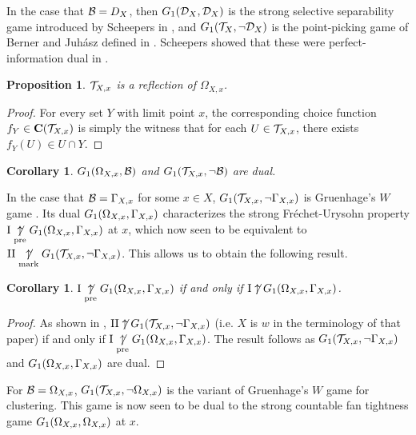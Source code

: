 \documentclass{amsart}
\theoremstyle{plain}
\newtheorem{corollary}[theorem]{Corollary}
\newtheorem{proposition}[theorem]{Proposition}
\theoremstyle{definition}
\theoremstyle{remark}
\theoremstyle{plain}
\theoremstyle{definition}
\theoremstyle{remark}
\begin{document}
In the case that \(\mathcal{B}=D_X\), then \(G_{1}(\mathcal{D}_X,\mathcal{D}_X)\) is the strong selective
separability game introduced by Scheepers 
in \cite{MR1711901}, and \(G_{1}(\mathcal{T}_X,\neg\mathcal{D}_X)\) is the
point-picking game of Berner and Juh\'asz defined in \cite{MR775687}. Scheepers showed that these
were perfect-information dual in \cite{MR1711901}.

\begin{proposition}
  \(\mathcal{T}_{X,x}\) is a reflection of \(\Omega_{X,x}\).
\end{proposition}
\begin{proof}
  For every set \(Y\) with limit point \(x\), the corresponding choice function \(f_Y\in\mathbf C(\mathcal{T}_{X,x})\) is simply
  the witness that for each \(U\in\mathcal{T}_{X,x}\), there exists \(f_Y(U)\in U\cap Y\).
\end{proof}

\begin{corollary}
  \(G_{1}(\Omega_{X,x},\mathcal{B})\) and \(G_{1}(\mathcal{T}_{X,x},\neg\mathcal{B})\) are dual.
\end{corollary}

In the case that \(\mathcal{B}=\Gamma_{X,x}\) for some \(x\in X\), \(G_{1}(\mathcal{T}_{X,x},\neg\Gamma_{X,x})\)
is Gruenhage's \(W\) game \cite{MR0413049}. Its dual \(G_{1}(\Omega_{X,x},\Gamma_{X,x})\) characterizes
the strong Fr\'echet-Urysohn property \(\mathrm{I}\underset{\text{pre}}{\not\uparrow}G_{1}(\Omega_{X,x},\Gamma_{X,x})\) at \(x\),
which now seen to be equivalent to \(\mathrm{II}\underset{\text{mark}}{\not\uparrow}G_{1}(\mathcal{T}_{X,x},\neg\Gamma_{X,x})\).
This allows us to obtain the following result.

\begin{corollary}
  \(\mathrm{I}\underset{\text{pre}}{\not\uparrow}G_{1}(\Omega_{X,x},\Gamma_{X,x})\)
  if and only if
  \(\mathrm{I}\not\uparrow G_{1}(\Omega_{X,x},\Gamma_{X,x})\).
\end{corollary} 
\begin{proof}
  As shown in \cite{MR510910},
  \(\mathrm{II}\not\uparrow G_{1}(\mathcal{T}_{X,x},\neg\Gamma_{X,x})\) (i.e. \(X\) is \(w\) in the
  terminology of that paper)
  if and only if \(\mathrm{I}\underset{\text{pre}}{\not\uparrow}G_{1}(\Omega_{X,x},\Gamma_{X,x})\).
  The result follows as 
  \(G_{1}(\mathcal{T}_{X,x},\neg\Gamma_{X,x})\) and
  \(G_{1}(\Omega_{X,x},\Gamma_{X,x})\) are dual.
\end{proof}

For \(\mathcal{B}=\Omega_{X,x}\), \(G_{1}(\mathcal{T}_{X,x},\neg\Omega_{X,x})\) is the variant of
Gruenhage's \(W\) game for clustering. This game is now seen to be dual to the strong countable fan tightness game
\(G_{1}(\Omega_{X,x},\Omega_{X,x})\) at \(x\).
\end{document}
